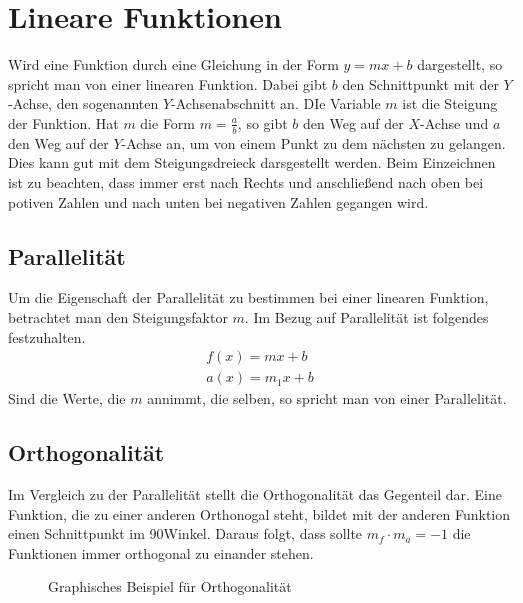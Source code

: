 \section{Lineare Funktionen}
Wird eine Funktion durch eine Gleichung in der Form $y=mx+b$ dargestellt, so spricht man von einer linearen Funktion. Dabei gibt $b$ den Schnittpunkt mit der $Y$-Achse, den sogenannten $Y$-Achsenabschnitt an. DIe Variable $m$ ist die Steigung der Funktion. Hat $m$ die Form $m=\frac{a}{b}$, so gibt $b$ den Weg auf der $X$-Achse und $a$ den Weg auf der $Y$-Achse an, um von einem Punkt zu dem nächsten zu gelangen. Dies kann gut mit dem Steigungsdreieck darsgestellt werden. Beim Einzeichnen ist zu beachten, dass immer erst nach Rechts und anschließend nach oben bei potiven Zahlen und nach unten bei negativen Zahlen gegangen wird.
\subsection{Parallelität} Um die Eigenschaft der Parallelität zu bestimmen bei einer linearen Funktion, betrachtet man den Steigungsfaktor $m$.
Im Bezug auf Parallelität ist folgendes festzuhalten. 
\begin{align*}
	f(x)=mx+b\\
	a(x)=m_1x+b
\end{align*}
Sind die Werte, die $m$ annimmt, die selben, so spricht man von einer Parallelität.
\subsection{Orthogonalität} Im Vergleich zu der Parallelität stellt die Orthogonalität das Gegenteil dar. Eine Funktion, die zu einer anderen Orthonogal steht, bildet mit der anderen Funktion einen Schnittpunkt im 90\degree Winkel. Daraus folgt, dass sollte $m_f\cdot m_a=-1$ die Funktionen immer orthogonal zu einander stehen.
\begin{figure}[h!]
\centering
{}
\caption{Graphisches Beispiel für Orthogonalität}
\label{}
\end{figure}
